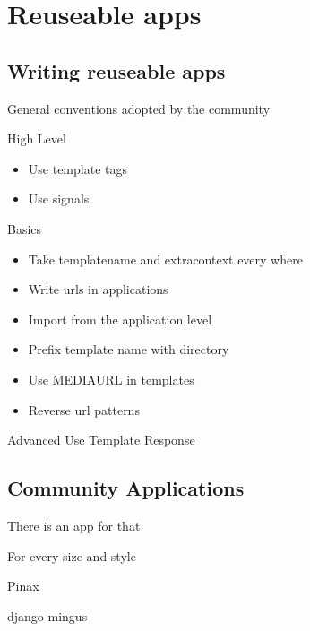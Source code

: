 \documentclass{beamer}
\begin{document}
\section{Reuseable apps}
	\subsection{Writing reuseable apps}
		\begin{frame}
			General conventions adopted by the community
		\end{frame}
		\begin{frame}
			{High Level}                                        
		\begin{itemize}                                                    \item
			Use template tags                                       \pause \item
			Use signals                             
		\end{itemize}
		\end{frame}
		\begin{frame}
			{Basics}                                                       
		\begin{itemize}                                                    \item
			Take templatename and extracontext every where          \pause \item
			Write urls in applications                              \pause \item
			Import from the application level                       \pause \item
			Prefix template name with directory                     \pause \item
			Use MEDIAURL in templates                              \pause \item
			Reverse url patterns
		\end{itemize}
		\end{frame}
		\begin{frame}
			{Advanced}                              
			Use Template Response
		\end{frame}
		
	\subsection{Community Applications}
		\begin{frame}
			{There is an app for that}
		\end{frame}
		\begin{frame}
			{For every size and style}
		\end{frame}
		\begin{frame}
			{Pinax}
		\end{frame}
		\begin{frame}
			{django-mingus}
		\end{frame}
\end{document}
